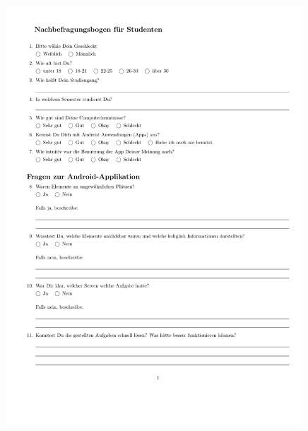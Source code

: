\begin{figure}
  \vspace{-20pt}
  \begin{center}
    \includegraphics[page=2,width=0.99\textwidth]{./images/student}
  \end{center}
  \vspace{-40pt}
\end{figure}


